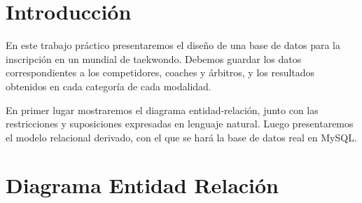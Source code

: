 \documentclass[a4paper]{article}
\begin{document}
\thispagestyle{empty}
\maketitle
\newpage

\tableofcontents

\newpage

\section{Introducción}

En este trabajo práctico presentaremos el diseño de una base de datos para la inscripción en un mundial de taekwondo. Debemos guardar los datos correspondientes a los competidores, coaches y árbitros, y los resultados obtenidos en cada categoría de cada modalidad.

En primer lugar mostraremos el diagrama entidad-relación, junto con las restricciones y suposiciones expresadas en lenguaje natural. Luego presentaremos el modelo relacional derivado, con el que se hará la base de datos real en MySQL.

\section{Diagrama Entidad Relación}
\end{document}
